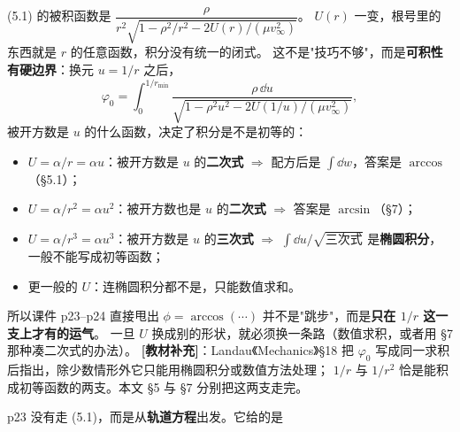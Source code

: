 \documentclass[11pt]{ctexart}
\begin{document}


(5.1) 的被积函数是 $\dfrac{\rho}{r^{2}\sqrt{1-\rho^{2}/r^{2}-2U(r)/(\mu v_\infty^{2})}}$。
$U(r)$ 一变，根号里的东西就是 $r$ 的任意函数，积分没有统一的闭式。
这不是"技巧不够"，而是\textbf{可积性有硬边界}：换元 $u=1/r$ 之后，
\[
\varphi_0=\int_{0}^{1/r_{\min}}\frac{\rho\,\dd u}{\sqrt{1-\rho^{2}u^{2}-2U(1/u)/(\mu v_\infty^{2})}} ,
\]
被开方数是 $u$ 的什么函数，决定了积分是不是初等的：

\begin{itemize}
\item $U=\alpha/r=\alpha u$：被开方数是 $u$ 的\textbf{二次式} $\Rightarrow$ 配方后是 $\int\dd w$，答案是 $\arccos$（§5.1）；
\item $U=\alpha/r^{2}=\alpha u^{2}$：被开方数也是 $u$ 的\textbf{二次式} $\Rightarrow$ 答案是 $\arcsin$（§7）；
\item $U=\alpha/r^{3}=\alpha u^{3}$：被开方数是 $u$ 的\textbf{三次式} $\Rightarrow$ $\int\dd u/\sqrt{\text{三次式}}$ 是\textbf{椭圆积分}，一般不能写成初等函数；
\item 更一般的 $U$：连椭圆积分都不是，只能数值求和。
\end{itemize}

所以课件 p23--p24 直接甩出 $\phi=\arccos(\cdots)$ 并不是"跳步"，而是\textbf{只在 $1/r$ 这一支上才有的运气}。
一旦 $U$ 换成别的形状，就必须换一条路（数值求积，或者用 §7 那种凑二次式的办法）。
\textbf{[教材补充]}：Landau《Mechanics》§18 把 $\varphi_0$ 写成同一求积后指出，除少数情形外它只能用椭圆积分或数值方法处理；
$1/r$ 与 $1/r^2$ 恰是能积成初等函数的两支。本文 §5 与 §7 分别把这两支走完。


p23 没有走 (5.1)，而是从\textbf{轨道方程}出发。它给的是
\end{document}
